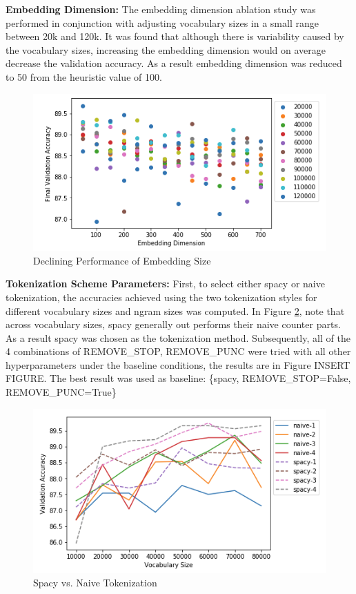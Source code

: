 \documentclass[a4paper,10pt]{article}
\begin{document}
\par
\justify
\textbf{Embedding Dimension:} The embedding dimension ablation study was performed in conjunction with adjusting vocabulary sizes in a small range between 20k and 120k. It was found that although there is variability caused by the vocabulary sizes, increasing the embedding dimension would on average decrease the validation accuracy. As a result embedding dimension was reduced to 50 from the heuristic value of 100.

\begin{figure}[h]
    \centering
    \includegraphics[scale=0.4]{embedding}
    \caption{Declining Performance of Embedding Size}
    \label{fig:embedding}
\end{figure}


\par
\justify
\textbf{Tokenization Scheme Parameters:} First, to select either spacy or naive tokenization, the accuracies achieved using the two tokenization styles for different vocabulary sizes and ngram sizes was computed. In Figure \ref{fig:spacynaive}, note that across vocabulary sizes, spacy generally out performs their naive counter parts. As a result spacy was chosen as the tokenization method. Subsequently, all of the 4 combinations of REMOVE\_STOP, REMOVE\_PUNC were tried with all other hyperparameters under the baseline conditions, the results are in Figure INSERT FIGURE. The best result was used as baseline: \{spacy, REMOVE\_STOP=False, REMOVE\_PUNC=True\}

\begin{figure}[h]
    \centering
    \includegraphics[scale=0.4]{spacynaive}
    \caption{Spacy vs. Naive Tokenization}
    \label{fig:spacynaive}
\end{figure}
\end{document}
